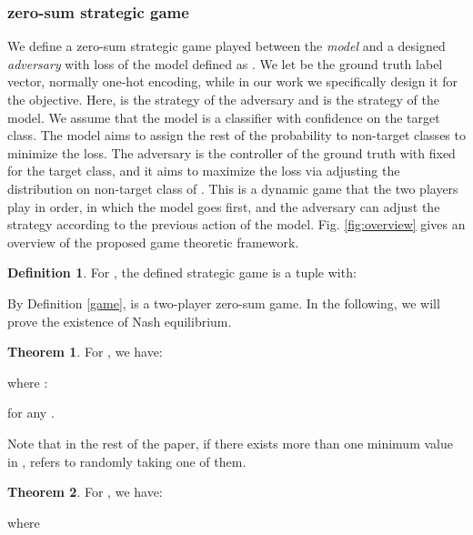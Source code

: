 \documentclass{article}
\theoremstyle{definition}
\newtheorem{definition}{Definition}
\newtheorem{theorem}{Theorem}
\begin{document}
\subsubsection{ zero-sum strategic game}
We define a zero-sum strategic game played between the \emph{model} and a designed \emph{adversary} with loss of the model defined as . 
 We let  be the ground truth label vector, normally one-hot encoding, while in our work we specifically design it for the objective.
Here,  is the strategy of the adversary and  is the strategy of the model. We assume that the model is a classifier with confidence  on the target class. The model aims to assign the rest of the probability  to non-target classes to minimize the loss. The adversary is the controller of the ground truth with fixed  for the target class, and it aims to maximize the loss via adjusting the distribution on non-target class of . This is a dynamic game that the two players play in order, in which the model goes first, and the adversary can adjust the strategy according to the previous action of the model. Fig. \ref{fig:overview} gives an overview of the proposed game theoretic framework.

\begin{definition}
For , the defined strategic game is a tuple  with:

\end{definition}

By Definition \ref{game},  is a two-player zero-sum game. In the following, we will prove the existence of Nash equilibrium.
\begin{theorem} \label{adversary}
For , we have:

where : 

for any .

\end{theorem}

Note that in the rest of the paper, if there exists more than one minimum value in ,  refers to randomly taking one of them.

\begin{theorem} \label{model}
For , we have:

where

\end{theorem}
\end{document}
